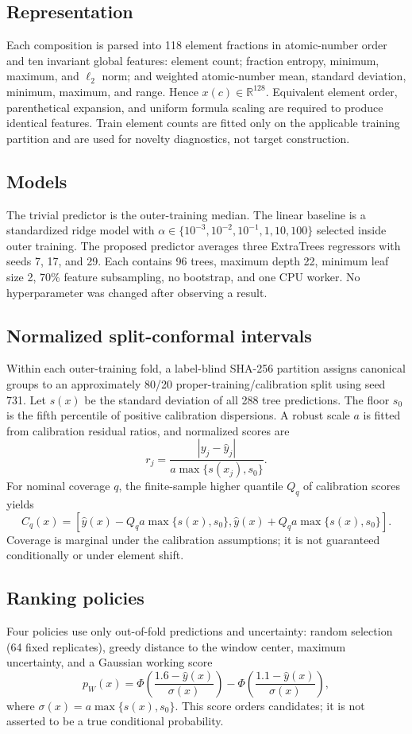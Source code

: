 \documentclass[11pt]{article}
\begin{document}
\subsection{Representation}
Each composition is parsed into 118 element fractions in atomic-number order and ten invariant global features: element count; fraction entropy, minimum, maximum, and $\ell_2$ norm; and weighted atomic-number mean, standard deviation, minimum, maximum, and range. Hence $x(c)\in\mathbb{R}^{128}$. Equivalent element order, parenthetical expansion, and uniform formula scaling are required to produce identical features. Train element counts are fitted only on the applicable training partition and are used for novelty diagnostics, not target construction.

\subsection{Models}
The trivial predictor is the outer-training median. The linear baseline is a standardized ridge model with $\alpha\in\{10^{-3},10^{-2},10^{-1},1,10,100\}$ selected inside outer training. The proposed predictor averages three ExtraTrees regressors with seeds 7, 17, and 29. Each contains 96 trees, maximum depth 22, minimum leaf size 2, 70\% feature subsampling, no bootstrap, and one CPU worker. No hyperparameter was changed after observing a result.

\subsection{Normalized split-conformal intervals}
Within each outer-training fold, a label-blind SHA-256 partition assigns canonical groups to an approximately 80/20 proper-training/calibration split using seed 731. Let $s(x)$ be the standard deviation of all 288 tree predictions. The floor $s_0$ is the fifth percentile of positive calibration dispersions. A robust scale $a$ is fitted from calibration residual ratios, and normalized scores are
\[
r_j=\frac{|y_j-\hat y_j|}{a\max\{s(x_j),s_0\}}.
\]
For nominal coverage $q$, the finite-sample higher quantile $Q_q$ of calibration scores yields
\[
C_q(x)=\left[\hat y(x)-Q_q a\max\{s(x),s_0\},
\hat y(x)+Q_q a\max\{s(x),s_0\}\right].
\]
Coverage is marginal under the calibration assumptions; it is not guaranteed conditionally or under element shift.

\subsection{Ranking policies}
Four policies use only out-of-fold predictions and uncertainty: random selection (64 fixed replicates), greedy distance to the window center, maximum uncertainty, and a Gaussian working score
\[
p_W(x)=\Phi\!\left(\frac{1.6-\hat y(x)}{\sigma(x)}\right)-
\Phi\!\left(\frac{1.1-\hat y(x)}{\sigma(x)}\right),
\]
where $\sigma(x)=a\max\{s(x),s_0\}$. This score orders candidates; it is not asserted to be a true conditional probability.
\end{document}
